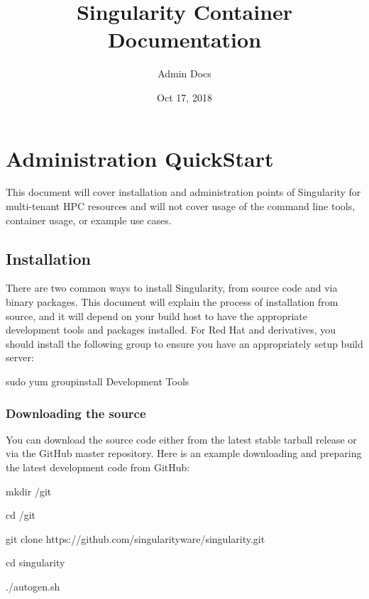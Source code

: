 \documentclass[letterpaper,10pt,english]{sphinxmanual}
\title{Singularity Container Documentation}
\date{Oct 17, 2018}
\author{Admin Docs}
\begin{document}
\maketitle
\sphinxtableofcontents
{}\label{\detokenize{index::doc}}



\chapter{Administration QuickStart}
\label{\detokenize{admin_quickstart:administration-quickstart}}\label{\detokenize{admin_quickstart::doc}}
This document will cover installation and administration points of
Singularity for multi-tenant HPC resources and will not cover usage of
the command line tools, container usage, or example use cases.


\section{Installation}
\label{\detokenize{admin_quickstart:installation}}
There are two common ways to install Singularity, from source code and
via binary packages. This document will explain the process of
installation from source, and it will depend on your build host to have
the appropriate development tools and packages installed. For Red Hat
and derivatives, you should install the following  group to ensure you
have an appropriately setup build server:

%
\begin{sphinxVerbatim}[commandchars=\\\{\}]
\PYGZdl{} sudo yum groupinstall \PYGZdq{}Development Tools\PYGZdq{}
\end{sphinxVerbatim}


\subsection{Downloading the source}
\label{\detokenize{admin_quickstart:downloading-the-source}}
You can download the source code either from the latest stable tarball
release or via the GitHub master repository. Here is an example
downloading and preparing the latest development code from GitHub:

%
\begin{sphinxVerbatim}[commandchars=\\\{\}]
\PYGZdl{} mkdir \PYGZti{}/git

\PYGZdl{} cd \PYGZti{}/git

\PYGZdl{} git clone https://github.com/singularityware/singularity.git

\PYGZdl{} cd singularity

\PYGZdl{} ./autogen.sh
\end{sphinxVerbatim}
\end{document}
